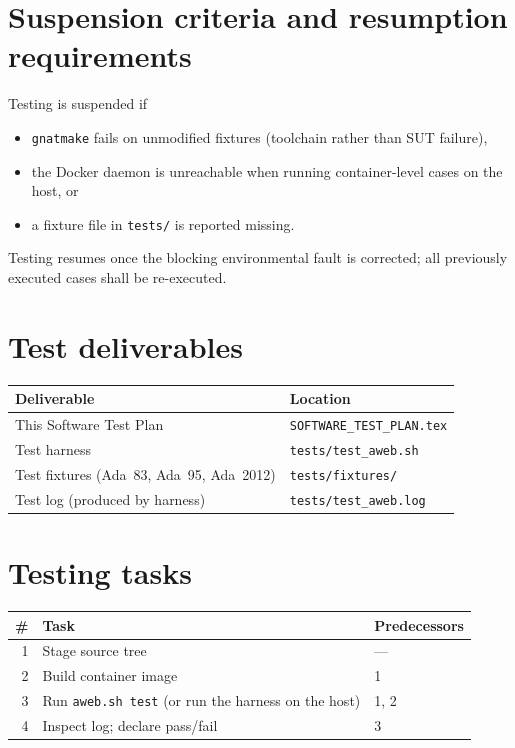 \documentclass[11pt]{article}
\begin{document}
\section{Suspension criteria and resumption requirements}
Testing is suspended if
\begin{itemize}[leftmargin=*]
  \item \texttt{gnatmake} fails on unmodified fixtures (toolchain rather
        than SUT failure),
  \item the Docker daemon is unreachable when running container-level
        cases on the host, or
  \item a fixture file in \texttt{tests/} is reported missing.
\end{itemize}
Testing resumes once the blocking environmental fault is corrected; all
previously executed cases shall be re-executed.

\section{Test deliverables}

\begin{center}
\begin{tabularx}{\linewidth}{@{}lX@{}}
\toprule
Deliverable                        & Location\\
\midrule
This Software Test Plan            & \texttt{SOFTWARE\_TEST\_PLAN.tex}\\
Test harness                       & \texttt{tests/test\_aweb.sh}\\
Test fixtures (Ada~83, Ada~95, Ada~2012) & \texttt{tests/fixtures/}\\
Test log (produced by harness)     & \texttt{tests/test\_aweb.log}\\
\bottomrule
\end{tabularx}
\end{center}

\section{Testing tasks}

\begin{center}
\begin{tabular}{@{}rll@{}}
\toprule
\# & Task & Predecessors\\
\midrule
1 & Stage source tree                                   & ---\\
2 & Build container image                               & 1\\
3 & Run \texttt{aweb.sh test} (or run the harness on the host) & 1, 2\\
4 & Inspect log; declare pass/fail                      & 3\\
\bottomrule
\end{tabular}
\end{center}
\end{document}
